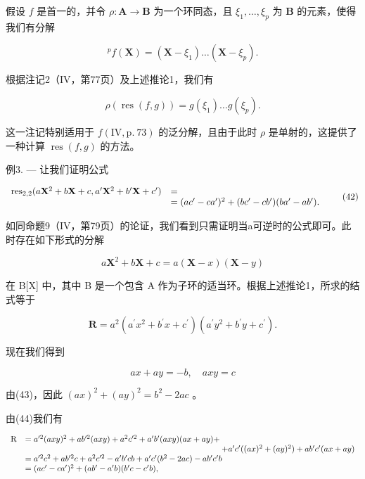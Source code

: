假设 \(f\) 是首一的，并令 \(\rho: \mathbf{A} \to \mathbf{B}\) 为一个环同态，且 \(\xi_{1}, \ldots, \xi_{p}\) 为 \(\mathbf{B}\) 的元素，使得我们有分解

\[
{ } ^ { p } f ( \mathbf { X } ) = ( \mathbf { X } - \xi _ { 1 } ) \dots ( \mathbf { X } - \xi _ { p } ) .
\]

根据注记2（IV，第77页）及上述推论1，我们有

\[
\rho (\operatorname{res} (f, g)) = g (\xi_ {1}) \dots g (\xi_ {p}).
\]

这一注记特别适用于 \(f(\mathrm{IV}, \mathrm{p.~73})\) 的泛分解，且由于此时 \(\rho\) 是单射的，这提供了一种计算 \(\operatorname{res}(f, g)\) 的方法。

例3. --- 让我们证明公式

\[
\begin{array}{r l} \operatorname{res} _ {2, 2} (a \mathbf {X} ^ {2} + b \mathbf {X} + c, a ^ {\prime} \mathbf {X} ^ {2} + b ^ {\prime} \mathbf {X} + c ^ {\prime}) & = \\ & = (a c ^ {\prime} - c a ^ {\prime}) ^ {2} + (b c ^ {\prime} - c b ^ {\prime}) (b a ^ {\prime} - a b ^ {\prime}). \end{array}\tag{42}
\]

如同命题9（IV，第79页）的论证，我们看到只需证明当a可逆时的公式即可。此时存在如下形式的分解

\[
a \mathbf {X} ^ {2} + b \mathbf {X} + c = a (\mathbf {X} - x) (\mathbf {X} - y)\tag{43}
\]

在 B{[}X{]} 中，其中 B 是一个包含 A 作为子环的适当环。根据上述推论1，所求的结式等于

\[
\mathbf {R} = a ^ {2} \left(a ^ {\prime} x ^ {2} + b ^ {\prime} x + c ^ {\prime}\right) \left(a ^ {\prime} y ^ {2} + b ^ {\prime} y + c ^ {\prime}\right).\tag{44}
\]

现在我们得到

\[
a x + a y = - b, \quad a x y = c
\]

由(43)，因此 \((ax)^2 + (ay)^2 = b^2 - 2ac\) 。

由(44)我们有

\[
\begin{array}{r l} \mathrm{R} & = a ^ {\prime 2} (a x y) ^ {2} + a b ^ {\prime 2} (a x y) + a ^ {2} c ^ {\prime 2} + a ^ {\prime} b ^ {\prime} (a x y) (a x + a y) + \\ & \qquad \qquad \qquad \qquad \qquad \qquad \qquad \qquad \qquad \qquad \qquad \qquad + a ^ {\prime} c ^ {\prime} ((a x) ^ {2} + (a y) ^ {2}) + a b ^ {\prime} c ^ {\prime} (a x + a y) \\ & = a ^ {\prime 2} c ^ {2} + a b ^ {\prime 2} c + a ^ {2} c ^ {\prime 2} - a ^ {\prime} b ^ {\prime} c b + a ^ {\prime} c ^ {\prime} (b ^ {2} - 2 a c) - a b ^ {\prime} c ^ {\prime} b \\ & = (a c ^ {\prime} - c a ^ {\prime}) ^ {2} + (a b ^ {\prime} - a ^ {\prime} b) (b ^ {\prime} c - c ^ {\prime} b), \end{array}
\]

